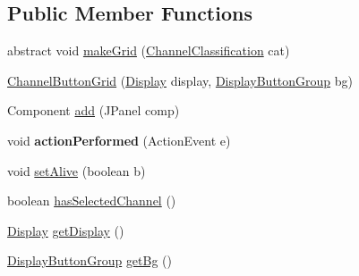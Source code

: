 \subsection*{Public Member Functions}
\begin{DoxyCompactItemize}
\item 
abstract void \hyperlink{classgov_1_1fnal_1_1ppd_1_1dd_1_1changer_1_1ChannelButtonGrid_a5acf39593b87514d5015b219e91ddeac}{make\-Grid} (\hyperlink{classgov_1_1fnal_1_1ppd_1_1dd_1_1changer_1_1ChannelClassification}{Channel\-Classification} cat)
\item 
\hyperlink{classgov_1_1fnal_1_1ppd_1_1dd_1_1changer_1_1ChannelButtonGrid_a71bade30c8299336c618dbc8f32b3a07}{Channel\-Button\-Grid} (\hyperlink{interfacegov_1_1fnal_1_1ppd_1_1dd_1_1signage_1_1Display}{Display} display, \hyperlink{classgov_1_1fnal_1_1ppd_1_1dd_1_1util_1_1DisplayButtonGroup}{Display\-Button\-Group} bg)
\item 
Component \hyperlink{classgov_1_1fnal_1_1ppd_1_1dd_1_1changer_1_1ChannelButtonGrid_a456b0016723ac7fec8acaf6f7d6cbabf}{add} (J\-Panel comp)
\item 
\hypertarget{classgov_1_1fnal_1_1ppd_1_1dd_1_1changer_1_1ChannelButtonGrid_afaef645111328ee05291017d3282201d}{void {\bfseries action\-Performed} (Action\-Event e)}\label{classgov_1_1fnal_1_1ppd_1_1dd_1_1changer_1_1ChannelButtonGrid_afaef645111328ee05291017d3282201d}

\item 
void \hyperlink{classgov_1_1fnal_1_1ppd_1_1dd_1_1changer_1_1ChannelButtonGrid_ae3b31f44dc32cfc243a1f10a3e0040c9}{set\-Alive} (boolean b)
\item 
boolean \hyperlink{classgov_1_1fnal_1_1ppd_1_1dd_1_1changer_1_1ChannelButtonGrid_af108bf6c3ca64c53f11326765fff1611}{has\-Selected\-Channel} ()
\item 
\hyperlink{interfacegov_1_1fnal_1_1ppd_1_1dd_1_1signage_1_1Display}{Display} \hyperlink{classgov_1_1fnal_1_1ppd_1_1dd_1_1changer_1_1ChannelButtonGrid_a08d1ab6630432d9e1817e36a9b6e857a}{get\-Display} ()
\item 
\hyperlink{classgov_1_1fnal_1_1ppd_1_1dd_1_1util_1_1DisplayButtonGroup}{Display\-Button\-Group} \hyperlink{classgov_1_1fnal_1_1ppd_1_1dd_1_1changer_1_1ChannelButtonGrid_a58309efc70714f1b3fc2810823a5df3c}{get\-Bg} ()
\end{DoxyCompactItemize}
